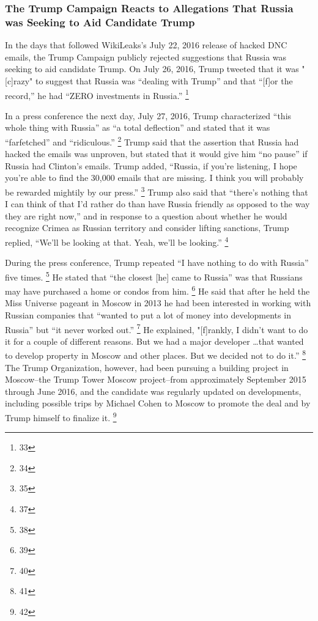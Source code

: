 \subsubsection{The Trump Campaign Reacts to Allegations That Russia was Seeking to Aid Candidate Trump}
In the days that followed WikiLeaks's July 22, 2016 release of hacked DNC emails, the Trump Campaign publicly rejected suggestions that Russia was seeking to aid candidate Trump.
On July 26, 2016, Trump tweeted that it was "[c]razy" to suggest that Russia was ``dealing with Trump'' and that ``[f]or the record,'' he had ``ZERO investments in Russia.''%
\footnote{33}

In a press conference the next day, July 27, 2016, Trump characterized ``this whole thing with Russia'' as ``a total deflection'' and stated that it was ``farfetched'' and ``ridiculous.''%
\footnote{34}
Trump said that the assertion that Russia had hacked the emails was unproven, but stated that it would give him ``no pause'' if Russia had Clinton's emails.%
Trump added, ``Russia, if you're listening, I hope you're able to find the 30,000 emails that are missing. I think you will probably be rewarded mightily by our press.''%
\footnote{35}
Trump also said that ``there's nothing that I can think of that I'd rather do than have Russia friendly as opposed to the way they are right now,'' and in response to a question about whether he would recognize Crimea as Russian territory and consider lifting sanctions, Trump replied, ``We'll be looking at that. Yeah, we'll be looking.''%
\footnote{37}

During the press conference, Trump repeated ``I have nothing to do with Russia'' five times.%
\footnote{38}
He stated that ``the closest [he] came to Russia'' was that Russians may have purchased a home or condos from him.%
\footnote{39}
He said that after he held the Miss Universe pageant in Moscow in 2013 he had been interested in working with Russian companies that ``wanted to put a lot of money into developments in Russia'' but ``it never worked out.''%
\footnote{40}
He explained, "[f]rankly, I didn't want to do it for a couple of different reasons.
But we had a major developer \dots that wanted to develop property in Moscow and other places.
But we decided not to do it.''%
\footnote{41}
The Trump Organization, however, had been pursuing a building project in Moscow--the Trump Tower Moscow project--from approximately September 2015 through June 2016, and the candidate was regularly updated on developments, including possible trips by Michael Cohen to Moscow to promote the deal and by Trump himself to finalize it.%
\footnote{42}


